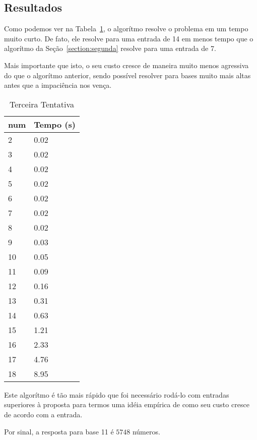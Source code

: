 \documentclass[12pt]{article}
\begin{document}
\subsection{Resultados}\label{section:terceira:resultados}

Como podemos ver na Tabela~\ref{table:resultados-3}, o algorítmo resolve o problema em um tempo muito curto. De fato, ele resolve para uma entrada de 14 em menos tempo que o algorítmo da Seção~\ref{section:segunda} resolve para uma entrada de 7.

Mais importante que isto, o seu custo cresce de maneira muito menos agressiva do que o algorítmo anterior, sendo possível resolver para bases muito mais altas antes que a impaciência nos vença.

\begin{table}[h]
\caption{Terceira Tentativa}
\label{table:resultados-3}
\begin{tabular}{ll}
  {\sf num} & Tempo (s) \\
  \hline
  2 & 0.02 \\
  3 & 0.02 \\
  4 & 0.02 \\
  5 & 0.02 \\
  6 & 0.02 \\
  7 & 0.02 \\
  8 & 0.02 \\
  9 & 0.03 \\
 10 & 0.05 \\
 11 & 0.09 \\
 12 & 0.16 \\
 13 & 0.31 \\
 14 & 0.63 \\
 15 & 1.21 \\
 16 & 2.33 \\
 17 & 4.76 \\
 18 & 8.95
  \end{tabular}
  \end{table}
  
Este algorítmo é tão mais rápido que foi necessário rodá-lo com entradas superiores à proposta para termos uma idéia empírica de como seu custo cresce de acordo com a entrada.

Por sinal, a resposta para base 11 é $5748$ números.
\end{document}
